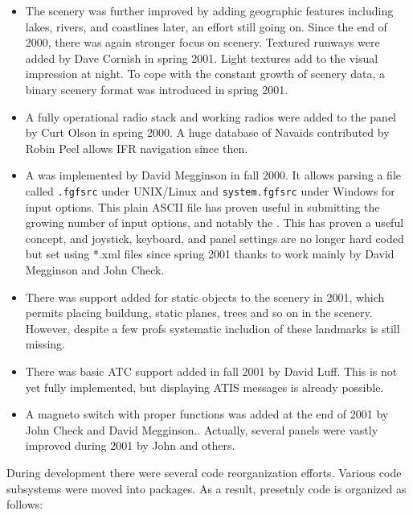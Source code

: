 \begin{itemize}
\item The scenery was further improved by adding geographic features including lakes, rivers,
and coastlines later, an effort still going on. Since the end of 2000, there was again
stronger focus on scenery. Textured runways were added by Dave Cornish in spring 2001. Light textures add to the visual impression at night. To cope with
the constant growth of scenery data, a binary scenery format was introduced in spring
2001. 

\item A fully operational radio stack and working radios were added to the panel by Curt
Olson in spring 2000. A huge database of Navaids contributed by Robin
Peel allows IFR navigation since then.

\item A  was implemented by David Megginson in
fall 2000. It allows parsing a file called \texttt{.fgfsrc} under
UNIX/Linux and \texttt{system.fgfsrc} under Windows for input
options. This plain ASCII file has proven useful in submitting the growing number of
input options, and notably the . This has proven a useful
concept, and joystick, keyboard, and panel settings are no longer hard coded but set
using *.xml files since spring 2001 thanks to work mainly by David Megginson and John
Check.

\item There was support added for static objects to the scenery in 2001, which permits placing buildung, static planes, trees and so on in the scenery. However, despite a few profs systematic includion of these landmarks is still missing.

\item There was basic ATC support added in fall 2001 by David Luff. This is not yet fully implemented, but displaying ATIS messages is already possible.

\item A magneto switch with proper functions was added at the end of 2001 by John Check and David Megginson.. Actually, several panels were vastly improved during 2001 by John and others.
\end{itemize}

During development there were several code reorganization efforts. Various code
subsystems were moved into packages. As a result, presetnly code is organized as follows:
\medskip

